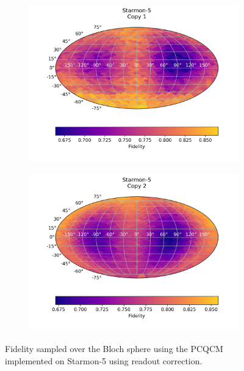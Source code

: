 \begin{figure}[H]
  \centering
  \begin{subfigure}{.5\textwidth}
    \centering
    \includegraphics[width=\textwidth]{Figures/PhaseCovariant/Starmon/FullSphere/results_starmon_corrected_copy1.png}
    \label{fig:pc_corrected_starmon_sphere_1}
  \end{subfigure}%
  \begin{subfigure}{.5\textwidth}
    \centering
    \includegraphics[width=\textwidth]{Figures/PhaseCovariant/Starmon/FullSphere/results_starmon_corrected_copy2.png}
    \label{fig:pc_corrected_starmon_sphere_2}
  \end{subfigure}
  \caption{Fidelity sampled over the Bloch sphere using the PCQCM implemented on Starmon-5 using readout correction.}
  \label{fig:pc_corrected_starmon_sphere}
\end{figure}

